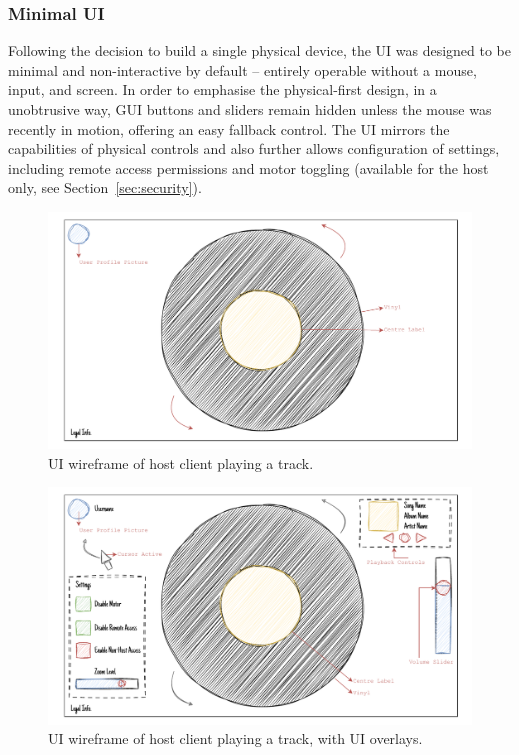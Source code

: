             \subsubsection{Minimal UI}
    
            Following the decision to build a single physical device, the UI was designed to be minimal and non-interactive by default -- entirely operable without a mouse, input, and screen. In order to emphasise the physical-first design, in a unobtrusive way, GUI buttons and sliders remain hidden unless the mouse was recently in motion, offering an easy fallback control. The UI mirrors the capabilities of physical controls and also further allows configuration of settings, including remote access permissions and motor toggling (available for the host only, see Section~\ref{sec:security}).
     
            \begin{figure}[h]
                \centering
                \includegraphics[width=0.85\linewidth]{images/SketchHostMin.pdf}
                \caption{UI wireframe of host client playing a track.}
                \label{fig:sketchHostQuiet}
            \end{figure}
            
            \begin{figure}[h]
                \centering
                \includegraphics[width=0.85\linewidth]{images/SketchHostMax.pdf}
                \caption{UI wireframe of host client playing a track, with UI overlays.}
                \label{fig:sketchHostGui}
            \end{figure}
    
